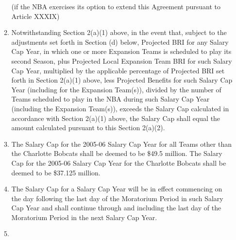 \documentclass[
]{book}
\begin{document}
\begin{enumerate}
\begin{enumerate}
    (if the NBA exercises its option to extend this Agreement pursuant to Article XXXIX)
  \item
    Notwithstanding Section 2(a)(1) above, in the event that, subject to the adjustments set forth in Section (d) below, Projected BRI for any Salary Cap Year, in which one or more Expansion Teams is scheduled to play its second Season, plus Projected Local Expansion Team BRI for such Salary Cap Year, multiplied by the applicable percentage of Projected BRI set forth in Section 2(a)(1) above, less Projected Benefits for such Salary Cap Year (including for the Expansion Team(s)), divided by the number of Teams scheduled to play in the NBA during such Salary Cap Year (including the Expansion Team(s)), exceeds the Salary Cap calculated in accordance with Section 2(a)(1) above, the Salary Cap shall equal the amount calculated pursuant to this Section 2(a)(2).
  \item
    The Salary Cap for the 2005-06 Salary Cap Year for all Teams other than the Charlotte Bobcats shall be deemed to be \$49.5 million. The Salary Cap for the 2005-06 Salary Cap Year for the Charlotte Bobcats shall be deemed to be \$37.125 million.
  \item
    The Salary Cap for a Salary Cap Year will be in effect commencing on the day following the last day of the Moratorium Period in such Salary Cap Year and shall continue through and including the last day of the Moratorium Period in the next Salary Cap Year.
  \item

\end{enumerate}
\end{enumerate}
\end{document}

